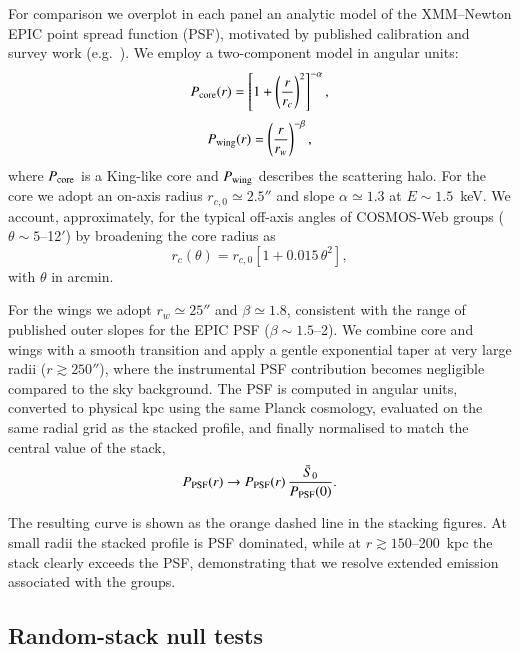\documentclass{aa}
\begin{document}
\begin{appendix}
For comparison we overplot in each panel an analytic model of the XMM--Newton EPIC point spread function (PSF), motivated by published calibration and survey work (e.g.\ \citealt{Hasinger2007}). We employ a two-component model in angular units:
\begin{equation}
P_{\rm core}(r) = \left[1 + \left(\frac{r}{r_c}\right)^2\right]^{-\alpha},
\label{eq:Pcore}
\end{equation}
\begin{equation}
P_{\rm wing}(r) = \left(\frac{r}{r_w}\right)^{-\beta},
\label{eq:Pwing}
\end{equation}
where $P_{\rm core}$ is a King-like core and $P_{\rm wing}$ describes the scattering halo. For the core we adopt an on-axis radius $r_{c,0} \simeq 2.5''$ and slope $\alpha \simeq 1.3$ at $E \sim 1.5$~keV. We account, approximately, for the typical off-axis angles of COSMOS-Web groups ($\theta \sim 5$--12$'$) by broadening the core radius as
\begin{equation}
r_c(\theta) = r_{c,0}\!\left[1 + 0.015\,\theta^2\right],
\label{eq:rc}
\end{equation}
with $\theta$ in arcmin.

For the wings we adopt $r_w \simeq 25''$ and $\beta \simeq 1.8$, consistent with the range of published outer slopes for the EPIC PSF ($\beta \sim 1.5$--2). We combine core and wings with a smooth transition and apply a gentle exponential taper at very large radii ($r \gtrsim 250''$), where the instrumental PSF contribution becomes negligible compared to the sky background. The PSF is computed in angular units, converted to physical kpc using the same Planck cosmology, evaluated on the same radial grid as the stacked profile, and finally normalised to match the central value of the stack,
\begin{equation}
P_{\rm PSF}(r) \to P_{\rm PSF}(r)\,\frac{\bar{S}_0}{P_{\rm PSF}(0)}.
\label{eq:PSFnorm}
\end{equation}

The resulting curve is shown as the orange dashed line in the stacking figures. At small radii the stacked profile is PSF dominated, while at $r \gtrsim 150$--200~kpc the stack clearly exceeds the PSF, demonstrating that we resolve extended emission associated with the groups.

\subsection{Random-stack null tests}


\end{appendix}
\end{document}
